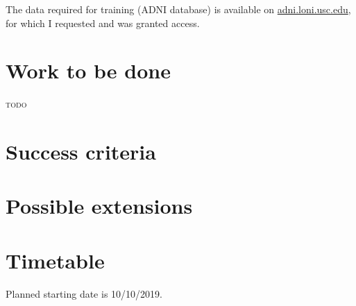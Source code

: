 \documentclass[12pt,a4paper,twoside]{article}
\begin{document}
The data required for training (ADNI database) is available on \url{adni.loni.usc.edu}, for which I requested and was granted access.

\section*{Work to be done}


\textsc{todo}

\section*{Success criteria}




\section*{Possible extensions}




\section*{Timetable}


Planned starting date is 10/10/2019.
\end{document}
